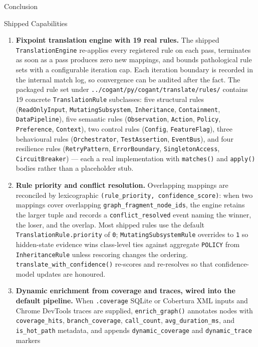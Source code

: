 \documentclass[
  ignorenonframetext,
]{beamer}
\providecommand{\tightlist}{%
  \setlength{\itemsep}{0pt}\setlength{\parskip}{0pt}}
\begin{document}
\begin{frame}[fragile]{Conclusion}
\begin{block}{Shipped Capabilities}
\begin{enumerate}
\tightlist
\item
  \textbf{Fixpoint translation engine with 19 real rules.} The shipped
  \texttt{TranslationEngine} re-applies every registered rule on each
  pass, terminates as soon as a pass produces zero new mappings, and
  bounds pathological rule sets with a configurable iteration cap. Each
  iteration boundary is recorded in the internal match log, so
  convergence can be audited after the fact. The packaged rule set under
  \texttt{../cogant/py/cogant/translate/rules/} contains 19 concrete
  \texttt{TranslationRule} subclasses: five structural rules
  (\texttt{ReadOnlyInput}, \texttt{MutatingSubsystem},
  \texttt{Inheritance}, \texttt{Containment}, \texttt{DataPipeline}),
  five semantic rules (\texttt{Observation}, \texttt{Action},
  \texttt{Policy}, \texttt{Preference}, \texttt{Context}), two control
  rules (\texttt{Config}, \texttt{FeatureFlag}), three behavioural rules
  (\texttt{Orchestrator}, \texttt{TestAssertion}, \texttt{EventBus}),
  and four resilience rules (\texttt{RetryPattern},
  \texttt{ErrorBoundary}, \texttt{SingletonAccess},
  \texttt{CircuitBreaker}) --- each a real implementation with
  \texttt{matches()} and \texttt{apply()} bodies rather than a
  placeholder stub.
\item
  \textbf{Rule priority and conflict resolution.} Overlapping mappings
  are reconciled by lexicographic
  \texttt{(rule\_priority,\ confidence\_score)}: when two mappings cover
  overlapping \texttt{graph\_fragment\_node\_ids}, the engine retains
  the larger tuple and records a \texttt{conflict\_resolved} event
  naming the winner, the loser, and the overlap. Most shipped rules use
  the default \texttt{TranslationRule.priority} of \texttt{0};
  \texttt{MutatingSubsystemRule} overrides to \texttt{1} so hidden-state
  evidence wins class-level ties against aggregate \texttt{POLICY} from
  \texttt{InheritanceRule} unless rescoring changes the ordering.
  \texttt{translate\_with\_confidence()} re-scores and re-resolves so
  that confidence-model updates are honoured.
\item
  \textbf{Dynamic enrichment from coverage and traces, wired into the
  default pipeline.} When \texttt{.coverage} SQLite or Cobertura XML
  inputs and Chrome DevTools traces are supplied,
  \texttt{enrich\_graph()} annotates nodes with \texttt{coverage\_hits},
  \texttt{branch\_coverage}, \texttt{call\_count},
  \texttt{avg\_duration\_ms}, and \texttt{is\_hot\_path} metadata, and
  appends \texttt{dynamic\_coverage} and \texttt{dynamic\_trace} markers

\end{enumerate}
\end{block}
\end{frame}
\end{document}
